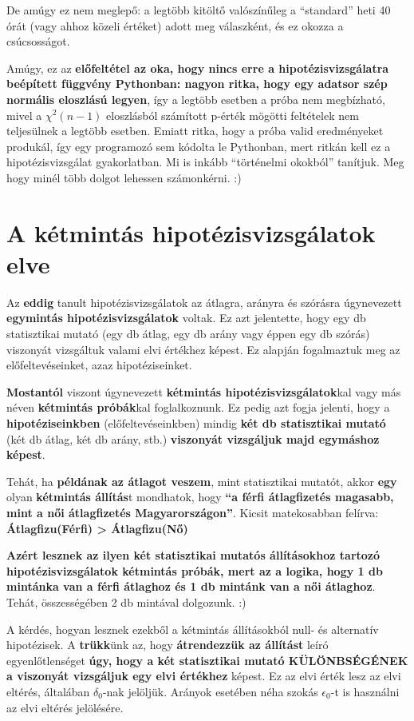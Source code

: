 \documentclass[
]{book}
\begin{document}
De amúgy ez nem meglepő: a legtöbb kitöltő valószínűleg a ``standard'' heti 40 órát (vagy ahhoz közeli értéket) adott meg válaszként, és ez okozza a csúcsosságot.

Amúgy, ez az \textbf{előfeltétel az oka, hogy nincs erre a hipotézisvizsgálatra beépített függvény Pythonban: nagyon ritka, hogy egy adatsor szép normális eloszlású legyen}, így a legtöbb esetben a próba nem megbízható, mivel a \(\chi^2(n-1)\) eloszlásból számított p-érték mögötti feltételek nem teljesülnek a legtöbb esetben.
Emiatt ritka, hogy a próba valid eredményeket produkál, így egy programozó sem kódolta le Pythonban, mert ritkán kell ez a hipotézisvizsgálat gyakorlatban. Mi is inkább ``történelmi okokból'' tanítjuk. Meg hogy minél több dolgot lehessen számonkérni. :)

\section{A kétmintás hipotézisvizsgálatok elve}\label{a-kuxe9tmintuxe1s-hipotuxe9zisvizsguxe1latok-elve}

Az \textbf{eddig} tanult hipotézisvizsgálatok az átlagra, arányra és szórásra úgynevezett \textbf{egymintás hipotézisvizsgálatok} voltak. Ez azt jelentette, hogy egy db statisztikai mutató (egy db átlag, egy db arány vagy éppen egy db szórás) viszonyát vizsgáltuk valami elvi értékhez képest. Ez alapján fogalmaztuk meg az előfeltevéseinket, azaz hipotéziseinket.

\textbf{Mostantól} viszont úgynevezett \textbf{kétmintás hipotézisvizsgálatok}kal vagy más néven \textbf{kétmintás próbák}kal foglalkoznunk. Ez pedig azt fogja jelenti, hogy a \textbf{hipotéziseinkben} (előfeltevéseinkben) mindig \textbf{két db statisztikai mutató} (két db átlag, két db arány, stb.) \textbf{viszonyát vizsgáljuk majd egymáshoz képest}.

Tehát, ha \textbf{példának az átlagot veszem}, mint statisztikai mutatót, akkor \textbf{egy} olyan \textbf{kétmintás állítás}t mondhatok, hogy \textbf{``a férfi átlagfizetés magasabb, mint a női átlagfizetés Magyarországon''}.
Kicsit matekosabban felírva: \textbf{Átlagfizu(Férfi) \textgreater{} Átlagfizu(Nő)}

\textbf{Azért lesznek az ilyen két statisztikai mutatós állításokhoz tartozó hipotézisvizsgálatok kétmintás próbák, mert az a logika, hogy 1 db mintánka van a férfi átlaghoz és 1 db mintánk van a női átlaghoz}. Tehát, összességében 2 db mintával dolgozunk. :)

A kérdés, hogyan lesznek ezekből a kétmintás állításokból null- és alternatív hipotézisek. A \textbf{trükk}ünk az, hogy \textbf{átrendezzük az állítást} leíró egyenlőtlenséget \textbf{úgy, hogy a két statisztikai mutató KÜLÖNBSÉGÉNEK a viszonyát vizsgáljuk egy elvi értékhez} képest. Ez az elvi érték lesz az elvi eltérés, általában \(\delta_0\)-nak jelöljük. Arányok esetében néha szokás \(\epsilon_0\)-t is használni az elvi eltérés jelölésére.
\end{document}
